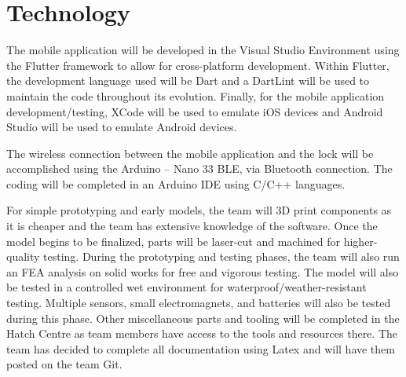 \documentclass{article}
\begin{document}

\section{Technology}

The mobile application will be developed in the Visual Studio Environment using the Flutter framework to allow for cross-platform development.  Within Flutter, the development language used will be Dart and a DartLint will be used to maintain the code throughout its evolution.  Finally, for the mobile application development/testing, XCode will be used to emulate iOS devices and Android Studio will be used to emulate Android devices. 


The wireless connection between the mobile application and the lock will be accomplished using the Arduino – Nano 33 BLE, via Bluetooth connection.  The coding will be completed in an Arduino IDE using C/C++ languages.

For simple prototyping and early models, the team will 3D print components as it is cheaper and the team has extensive knowledge of the software. Once the model begins to be finalized, parts will be laser-cut and machined for higher-quality testing. During the prototyping and testing phases, the team will also run an FEA analysis on solid works for free and vigorous testing. The model will also be tested in a controlled wet environment for waterproof/weather-resistant testing. Multiple sensors, small electromagnets, and batteries will also be tested during this phase. Other miscellaneous parts and tooling will be completed in the Hatch Centre as team members have access to the tools and resources there. The team has decided to complete all documentation using Latex and will have them posted on the team Git.
\end{document}
